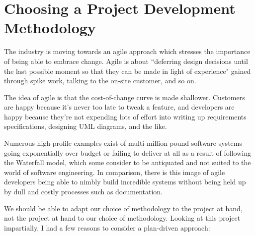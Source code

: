 \chapter{Choosing a Project Development Methodology}\label{appendix:methodology}

The industry is moving towards an agile approach which stresses the importance of being able to embrace change. Agile is about ``deferring design decisions until the last possible moment so that they can be made in light of experience" gained through spike work, talking to the on-site customer, and so on.~\cite{learningAgile}

The idea of agile is that the cost-of-change curve is made shallower. Customers are happy because it's never too late to tweak a feature, and developers are happy because they're not expending lots of effort into writing up requirements specifications, designing UML diagrams, and the like.

Numerous high-profile examples exist of multi-million pound software systems going exponentially over budget or failing to deliver at all as a result of following the Waterfall model, which some consider to be antiquated and not suited to the world of software engineering. In comparison, there is this image of agile developers being able to nimbly build incredible systems without being held up by dull and costly processes such as documentation.

We should be able to adapt our choice of methodology to the project at hand, not the project at hand to our choice of methodology. Looking at this project impartially, I had a few reasons to consider a plan-driven approach:


